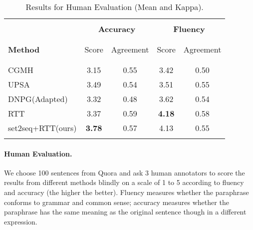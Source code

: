 \begin{table}[th]
\small
\centering
\begin{tabular}{lcccc}
\hline 
\\ [-1.8ex]
& \multicolumn{2}{c}{\textbf{Accuracy}} & \multicolumn{2}{c}{\textbf{Fluency}} \\
\\ [-1.8ex]
\cline{2-5}
\\ [-1.8ex]
\textbf{Method} & Score & Agreement & Score & Agreement \\
\\ [-2ex]
\hline
\\ [-1.8ex]
CGMH & 3.15 & 0.55 & 3.42 & 0.50 \\
UPSA & 3.49 & 0.54 & 3.51 & 0.55 \\
DNPG\scriptsize{(Adapted)} & 3.32 & 0.48 & 3.62 & 0.54 \\
RTT & 3.37 & 0.59 & \textbf{4.18} & 0.58 \\
set2seq+RTT\scriptsize{(ours)} & \textbf{3.78} &0.57 & 4.13 & 0.55 \\
\\ [-1.8ex]
\hline
\end{tabular}
\caption{\label{tab:human} Results for Human Evaluation (Mean and Kappa). }
\end{table}

\paragraph{Human Evaluation.}
We choose 100 sentences from Quora and ask 3 human annotators to score the 
results from different methods blindly on a scale of 1 to 5 according to 
fluency and accuracy (the higher the better). Fluency measures whether 
the paraphrase conforms to grammar and common sense; accuracy measures 
whether the paraphrase has the same meaning as the original sentence 
though in a different expression.



